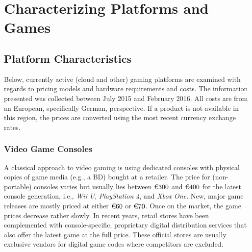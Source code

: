 \section{Characterizing Platforms and Games}
\label{sec:background}




\subsection{Platform Characteristics}

Below, currently active (cloud and other) gaming platforms are examined
with regards to pricing models and hardware requirements and costs. The
information presented was collected between July 2015 and February 2016.
All costs are from an European, specifically German, perspective. If a
product is not available in this region, the prices are converted using
the most recent currency exchange rates.

\subsubsection{Video Game Consoles}

A classical approach to video gaming is using dedicated consoles with
physical copies of game media (e.g., a BD) bought at a retailer. The
price for (non-portable) consoles varies but usually lies between
$\text{\texteuro} 300$ and $\text{\texteuro} 400$ for the latest console
generation, i.e., \textit{Wii U}, \textit{PlayStation 4}, and
\textit{Xbox One}. New, major game releases are mostly priced at either
$\text{\texteuro} 60$ or $\text{\texteuro} 70$. Once on the market, the
game prices decrease rather slowly. In recent years, retail stores have
been complemented with console-specific, proprietary digital
distribution services that also offer the latest game at the full price.
These official stores are usually exclusive vendors for digital game
codes where competitors are excluded.


